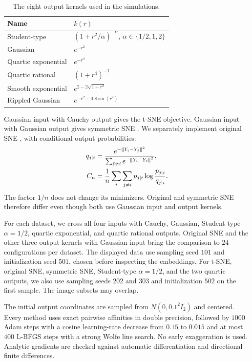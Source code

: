 \begin{table}[!ht]
    \centering
    \renewcommand{\arraystretch}{1.3}
    \begin{tabular}{ll}
        \hline
        Name & $k(r)$ \\
        \hline
        Student-type & $(1+r^2/\alpha)^{-\alpha}$,
        $\alpha\in\{1/2,1,2\}$ \\
        Gaussian & $e^{-r^2}$ \\
        Quartic exponential & $e^{-r^4}$ \\
        Quartic rational & $(1+r^4)^{-1}$ \\
        Smooth exponential & $e^{2-2\sqrt{1+r^2}}$ \\
        Rippled Gaussian & $e^{-r^2-0.8\sin(r^2)}$ \\
        \hline
    \end{tabular}
    \caption{The eight output kernels used in the simulations.}
    \label{tab:numerical-outputs}
\end{table}

Gaussian input with Cauchy output gives the t-SNE objective. Gaussian input
with Gaussian output gives symmetric SNE \citep{key}. We separately implement
original SNE \citep{NIPS2002_6150ccc6}, with conditional output probabilities:
\begin{align}
    q_{j|i}&=\frac{e^{-\left\lVert Y_i-Y_j\right\rVert^2}}
    {\sum_{\ell\ne i}e^{-\left\lVert Y_i-Y_\ell\right\rVert^2}}, \notag\\
    C_n&=\frac1n\sum_i\sum_{j\ne i}p_{j|i}
    \log\frac{p_{j|i}}{q_{j|i}}. \label{eq:numerical-sne}
\end{align}
The factor $1/n$ does not change its minimizers. Original and symmetric SNE
therefore differ even though both use Gaussian input and output kernels.

For each dataset, we cross all four inputs with Cauchy, Gaussian, Student-type
$\alpha=1/2$, quartic exponential, and quartic rational outputs. Original
SNE and the other three output kernels with Gaussian input bring the
comparison to $24$ configurations per dataset. The displayed data use
sampling seed $101$ and initialization seed $501$, chosen before inspecting
the embeddings. For t-SNE, original SNE, symmetric SNE, Student-type $\alpha=1/2$,
and the two quartic outputs, we also use sampling seeds $202$ and $303$ and
initialization $502$ on the first sample. The image subsets may overlap.

The initial output coordinates are sampled from $N(0,0.1^2I_2)$ and centered.
Every method uses exact pairwise affinities in double precision, followed by
$1000$ Adam steps with a cosine learning-rate decrease from $0.15$ to $0.015$
and at most $400$ L-BFGS steps with a strong Wolfe line search. No early
exaggeration is used. Analytic gradients are checked against automatic
differentiation and directional finite differences.

